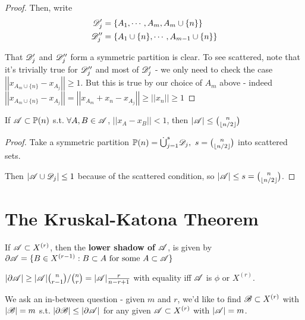 \documentclass[a4paper]{article}
\begin{document}
{\begin{proof}
	Then, write
	\begin{align*}
	\mathscr{D}_j'&=\{A_1,\cdots,A_m,A_m\cup\{n\}\}\\
	\mathscr{D}_j''&=\{A_1\cup\{n\},\cdots,A_{m-1}\cup\{n\}\}
	\end{align*}
	
	That $\mathscr{D}_j'$ and $\mathscr{D}_j''$ form a symmetric partition is clear. To see scattered, note that it's trivially true for $\mathscr{D}_j''$ and most of $\mathscr{D}_j'$ - we only need to check the case $\left|\left|x_{A_m\cup\{n\}}-x_{A_j}\right|\right|\geq 1$. But this is true by our choice of $A_m$ above - indeed $\left|\left|x_{A_m\cup\{n\}} - x_{A_j}\right|\right|=\left|\left|x_{A_m} + x_n - x_{A_j}\right|\right|\geq \left|\left|x_n\right|\right|\geq1$
\end{proof}

\begin{thm-num}
	If $\mathscr{A}\subset\mathbb{P}(n)$ s.t. $\forall A,B\in\mathscr{A}$, $\left|\left|x_A - x_B\right|\right|<1$, then $|\mathscr{A}|\leq\binom{n}{\left\lfloor n/2\right\rfloor}$
\end{thm-num}
\begin{proof}
	Take a symmetric partition $\P(n)=\dot{\bigcup}_{j=1}^{s}\calD_j,\ s=\binom{n}{\lf n/2\rf}$ into scattered sets.
	
	Then $\left|\mathscr{A}\cup\mathscr{D}_j\right|\leq 1$ because of the scattered condition, so $|\mathscr{A}|\leq s=\binom{n}{\left\lfloor n/2\right\rfloor}$.
\end{proof}

\section{The Kruskal-Katona Theorem}
\begin{defi}
	If $\mathscr{A}\subset X^{(r)}$, then the \textbf{lower shadow of $\mathscr{A}$}, is given by $\partial\mathscr{A}=\{B\in X^{(r-1)}:B\subset A \textrm{ for some } A\subset\mathscr{A} \}$	
\end{defi}

\begin{fact}
	$|\partial\mathscr{A}|\geq|\mathscr{A}|\binom{n}{r-1}/\binom{n}{r}=|\mathscr{A}|\frac{r}{n-r+1}$ with equality iff $\mathscr{A}$ is $\phi$ or $X^{(r)}$.
\end{fact}

\begin{aim}
	We ask an in-between question - given $m$ and $r$, we'd like to find $\mathscr{B}\subset X^{(r)}$ with $|\mathscr{B}|=m$ s.t. $|\partial\mathscr{B}|\leq|\partial\mathscr{A}|$ for any given $\mathscr{A}\subset X^{(r)}$ with $|\mathscr{A}|=m$.
\end{aim}

}
\end{document}
